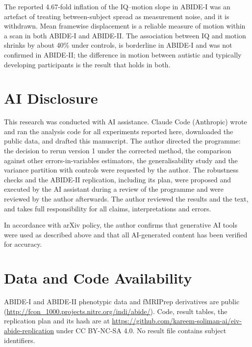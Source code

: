 \documentclass[11pt,a4paper]{article}
\begin{document}
The reported 4.67-fold inflation of the IQ--motion slope in ABIDE-I was an artefact of treating between-subject spread as measurement noise, and it is withdrawn. Mean framewise displacement is a reliable measure of motion within a scan in both ABIDE-I and ABIDE-II. The association between IQ and motion shrinks by about 40\% under controls, is borderline in ABIDE-I and was not confirmed in ABIDE-II; the difference in motion between autistic and typically developing participants is the result that holds in both.

\section*{AI Disclosure}

This research was conducted with AI assistance. Claude Code (Anthropic) wrote and ran the analysis code for all experiments reported here, downloaded the public data, and drafted this manuscript. The author directed the programme: the decision to rerun version 1 under the corrected method, the comparison against other errors-in-variables estimators, the generalisability study and the variance partition with controls were requested by the author. The robustness checks and the ABIDE-II replication, including its plan, were proposed and executed by the AI assistant during a review of the programme and were reviewed by the author afterwards. The author reviewed the results and the text, and takes full responsibility for all claims, interpretations and errors.

In accordance with arXiv policy, the author confirms that generative AI tools were used as described above and that all AI-generated content has been verified for accuracy.

\section*{Data and Code Availability}

ABIDE-I and ABIDE-II phenotypic data and fMRIPrep derivatives are public (\url{http://fcon_1000.projects.nitrc.org/indi/abide/}). Code, result tables, the replication plan and its hash are at \url{https://github.com/kareem-soliman-ai/eiv-abide-replication} under CC BY-NC-SA 4.0. No result file contains subject identifiers.
\end{document}
